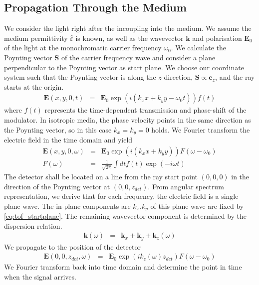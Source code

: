 \documentclass[12pt,a4paper,twoside,openright,BCOR10mm,headsepline,titlepage,abstracton,chapterprefix,final]{scrreprt}
\newcommand\Vector[1]{{\mathbf{#1}}}
\newcommand\wavenumber{k}
\newcommand\Wavevector{\Vector{\wavenumber}}
\newcommand\Tensor[1]{\hat{#1}}
\newcommand\scalarEfield{E}
\newcommand\Efield{\Vector{\scalarEfield}}
\newcommand\permittivity{\Tensor{\scalarpermittivity}}
\newcommand\scalarpermittivity{\varepsilon}
\begin{document}
\subsection{Propagation Through the Medium}
We consider the light right after the incoupling into the medium.
We assume the medium permittivity $\permittivity$ is known,
as well as the wavevector $\Wavevector$ and polarisation $\Efield_0$ of the light at the monochromatic carrier frequency $\omega_0$.
We calculate the Poynting vector $\Vector{S}$ of the carrier frequency wave 
and consider a plane perpendicular to the Poynting vector as start plane.
We choose our coordinate system such that the Poynting vector is along the $z$-direction, $\Vector{S} \propto \Vector{e}_z$,
and the ray starts at the origin.
\begin{eqnarray}
 \Efield(x,y,0, t) &=& \Efield_0 \exp (i ( \wavenumber_x x + \wavenumber_y y - \omega_0 t)) f(t)
\end{eqnarray}
where $f(t)$ represents the time-dependent transmission and phase-shift of the modulator.
In isotropic media, the phase velocity points in the same direction as the Poynting vector, 
so in this case $\wavenumber_x = \wavenumber_y = 0$ holds.
We Fourier transform the electric field in the time domain and yield
\begin{eqnarray}
 \Efield(x,y,0, \omega) &=& \Efield_0  \exp (i ( \wavenumber_x x+ \wavenumber_y y)) F(\omega-\omega_0) \label{eq:tof_startplane}\\
 F(\omega) &=& \frac{1}{\sqrt{2\pi}} \int dt f(t) \exp(-i \omega t)
\end{eqnarray}
The detector shall be located on a line from the ray start point $(0,0,0)$ in the direction of the Poynting vector at $(0,0,z_{det})$.
From angular spectrum representation, we derive that for each frequency, the electric field is a single plane wave.
The in-plane components are $\wavenumber_x$,$\wavenumber_y$ of this plane wave are fixed by \eqref{eq:tof_startplane}.
The remaining wavevector component is determined by the dispersion relation.
\begin{eqnarray}
 \Wavevector(\omega) &=& \Wavevector_x + \Wavevector_y + \Wavevector_z(\omega)
\end{eqnarray}
We propagate to the position of the detector
\begin{eqnarray}
\Efield(0, 0, z_{det}, \omega) &=& \Efield_0  \exp (i \wavenumber_z(\omega) z_{det}) F(\omega-\omega_0) 
\end{eqnarray}
We Fourier transform back into time domain and determine the point in time when the signal arrives.
\end{document}
